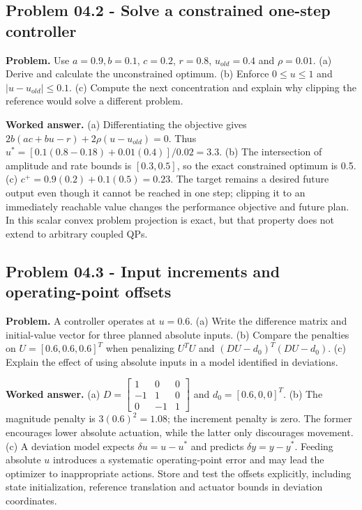 \documentclass[11pt,a4paper]{article}
\begin{document}
\subsection{Problem 04.2 - Solve a constrained one-step controller}
\textbf{Problem.} Use $a=0.9,b=0.1$, $c=0.2$, $r=0.8$, $u_{old}=0.4$ and $\rho=0.01$. (a) Derive and calculate the unconstrained optimum. (b) Enforce $0\leq u\leq1$ and $|u-u_{old}|\leq0.1$. (c) Compute the next concentration and explain why clipping the reference would solve a different problem.


\textbf{Worked answer.} (a) Differentiating the objective gives $2b(ac+bu-r)+2\rho(u-u_{old})=0$. Thus $u^*=[0.1(0.8-0.18)+0.01(0.4)]/0.02=3.3$. (b) The intersection of amplitude and rate bounds is $[0.3,0.5]$, so the exact constrained optimum is 0.5. (c) $c^+=0.9(0.2)+0.1(0.5)=0.23$. The target remains a desired future output even though it cannot be reached in one step; clipping it to an immediately reachable value changes the performance objective and future plan. In this scalar convex problem projection is exact, but that property does not extend to arbitrary coupled QPs.

\subsection{Problem 04.3 - Input increments and operating-point offsets}
\textbf{Problem.} A controller operates at $u=0.6$. (a) Write the difference matrix and initial-value vector for three planned absolute inputs. (b) Compare the penalties on $U=[0.6,0.6,0.6]^T$ when penalizing $U^TU$ and $(DU-d_0)^T(DU-d_0)$. (c) Explain the effect of using absolute inputs in a model identified in deviations.


\textbf{Worked answer.} (a) $D=\begin{bmatrix}1&0&0\\-1&1&0\\0&-1&1\end{bmatrix}$ and $d_0=[0.6,0,0]^T$. (b) The magnitude penalty is $3(0.6)^2=1.08$; the increment penalty is zero. The former encourages lower absolute actuation, while the latter only discourages movement. (c) A deviation model expects $\delta u=u-u^*$ and predicts $\delta y=y-y^*$. Feeding absolute $u$ introduces a systematic operating-point error and may lead the optimizer to inappropriate actions. Store and test the offsets explicitly, including state initialization, reference translation and actuator bounds in deviation coordinates.
\end{document}

